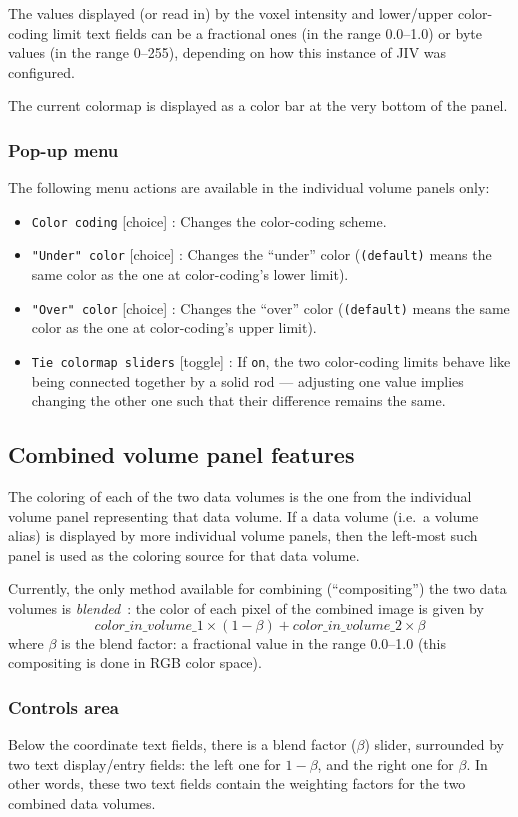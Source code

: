 The values displayed (or read in) by the voxel intensity and
lower/upper color-coding limit text fields can be a fractional ones
(in the range 0.0--1.0) or byte values (in the range 0--255),
depending on how this instance of JIV was configured.

The current colormap is displayed as a color bar at the very bottom of
the panel.

\subsubsection{Pop-up menu}
The following menu actions are available in the individual volume
panels only:
\begin{itemize}
\item \verb+Color coding+ [choice] : Changes the color-coding scheme.
\item \verb+"Under" color+ [choice] : Changes the ``under'' color
  (\verb+(default)+ means the same color as the one at color-coding's
  lower limit).
\item \verb+"Over" color+ [choice] : Changes the ``over'' color
  (\verb+(default)+ means the same color as the one at color-coding's
  upper limit).
\item \verb+Tie colormap sliders+ [toggle] : If \verb+on+, the two
  color-coding limits behave like being connected together by a solid
  rod --- adjusting one value implies changing the other one such that
  their difference remains the same.
\end{itemize}

\subsection{Combined volume panel features}
\label{sec:combined-panel-features}
The coloring of each of the two data volumes is the one from the
individual volume panel representing that data volume. If a data
volume (i.e.\ a volume alias) is displayed by more individual volume
panels, then the left-most such panel is used as the coloring source
for that data volume.

Currently, the only method available for combining (``compositing'')
the two data volumes is {\em blended}\ : the color of each pixel of
the combined image is given by
\[ color\_in\_volume\_1 \times ( 1 - \beta ) + 
color\_in\_volume\_2 \times \beta \] where $\beta$ is the blend
factor: a fractional value in the range 0.0--1.0 (this compositing is
done in RGB color space).

\subsubsection{Controls area}
Below the coordinate text fields, there is a blend factor ($\beta$)
slider, surrounded by two text display/entry fields: the left one for
$1 - \beta$, and the right one for $\beta$.  In other words, these two
text fields contain the weighting factors for the two combined data
volumes.


